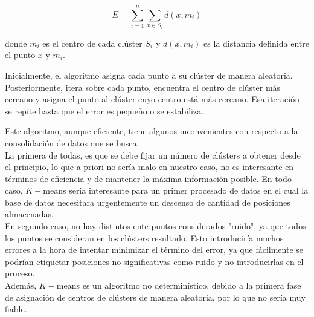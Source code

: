 \documentclass[a4paper, 12pt]{article}
\begin{document}
$$ E=\sum_{i=1}^{n} \sum_{x\in S_i} d(x, m_i) $$

donde $m_i$ es el centro de cada cl\'uster $S_i$ y $d(x, m_i)$ es la distancia definida entre el punto $x$ y $m_i$.

Inicialmente, el algoritmo asigna cada punto a su cl\'uster de manera aleatoria. Posteriormente, itera sobre cada punto, encuentra el centro de cl\'uster m\'as cercano y asigna el punto al cl\'uster cuyo centro est\'a m\'as cercano. Esa iteraci\'on se repite hasta que el error es peque\~no o se estabiliza.

Este algoritmo, aunque eficiente, tiene algunos inconvenientes con respecto a la consolidaci\'on de datos que se busca.
\\

La primera de todas, es que se debe fijar un n\'umero de cl\'usters a obtener desde el principio, lo que a priori no ser\'ia malo en nuestro caso, no es interesante en t\'erminos de eficiencia y de mantener la m\'axima informaci\'on posible. En todo caso, $K-$means ser\'ia interesante para un primer procesado de datos en el cual la base de datos necesitara urgentemente un descenso de cantidad de posiciones almacenadas. \\

En segundo caso, no hay distintos ente puntos considerados "ruido", ya que todos los puntos se consideran en los cl\'usters resultado. Esto introducir\'ia muchos errores a la hora de intentar minimizar el t\'ermino del error, ya que f\'acilmente se podr\'ian etiquetar posiciones no significativas como ruido y no introducirlas en el proceso.\\

Adem\'as, $K-$means es un algoritmo no determin\'istico, debido a la primera fase de asignaci\'on de centros de cl\'usters de manera aleatoria, por lo que no ser\'ia muy fiable.
\end{document}
